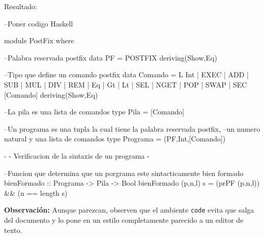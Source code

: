 \documentclass[spanish,12pt,letterpaper]{article}
\theoremstyle{break}
\begin{document}
Resultado:\\
\begin{code}
  --Poner codigo Haskell
  
  module PostFix where

  --Palabra reservada postfix
  data PF = POSTFIX deriving(Show,Eq)

  --Tipo que define un comando postfix
  data Comando = L Int | EXEC | ADD | SUB | MUL | DIV | REM | Eq | Gt | Lt | SEL | NGET | POP | SWAP | SEC [Comando]  deriving(Show,Eq)

  --La pila es una lista de comandos
  type Pila = [Comando]

  --Un programa es una tupla la cual tiene la palabra reservada postfix,
  --un numero natural y una lista de comandos
  type Programa = (PF,Int,[Comando])

  {-
    - Verificacion de la sintaxis de un programa
    -}

  --Funcion que determina que un porgrama este sintacticamente bien formado
  bienFormado :: Programa -> Pila -> Bool
  bienFormado (p,n,l) s = (prPF (p,n,l)) && (n == length s) 
\end{code}

\textbf{Observación:} Aunque parezcan, observen que el ambiente \verb!code! evita que salga del documento y lo pone
en un estilo completamente parecido a un editor de texto.

                  
\end{document}
